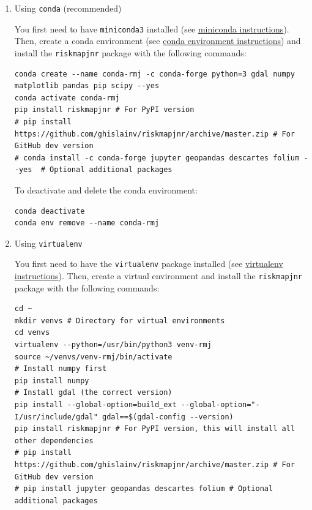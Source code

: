 \documentclass[paper=a4, 12pt, DIV=12]{scrartcl}
\begin{document}
\begin{enumerate}
\item Using \texttt{conda} (recommended)
\label{sec:org9a4f3b1}

You first need to have \texttt{miniconda3} installed (see \href{https://docs.conda.io/en/latest/miniconda.html}{miniconda instructions}). Then, create a conda environment (see \href{https://docs.conda.io/projects/conda/en/latest/user-guide/tasks/manage-environments.html}{conda environment instructions}) and install the \texttt{riskmapjnr} package with the following commands:

\begin{verbatim}
conda create --name conda-rmj -c conda-forge python=3 gdal numpy matplotlib pandas pip scipy --yes
conda activate conda-rmj
pip install riskmapjnr # For PyPI version
# pip install https://github.com/ghislainv/riskmapjnr/archive/master.zip # For GitHub dev version
# conda install -c conda-forge jupyter geopandas descartes folium --yes  # Optional additional packages
\end{verbatim}

To deactivate and delete the conda environment:

\begin{verbatim}
conda deactivate
conda env remove --name conda-rmj
\end{verbatim}

\item Using \texttt{virtualenv}
\label{sec:orgc9bc797}

You first need to have the \texttt{virtualenv} package installed (see \href{https://packaging.python.org/guides/installing-using-pip-and-virtual-environments/}{virtualenv instructions}). Then, create a virtual environment and install the \texttt{riskmapjnr} package with the following commands:

\begin{verbatim}
cd ~
mkdir venvs # Directory for virtual environments
cd venvs
virtualenv --python=/usr/bin/python3 venv-rmj
source ~/venvs/venv-rmj/bin/activate
# Install numpy first
pip install numpy
# Install gdal (the correct version) 
pip install --global-option=build_ext --global-option="-I/usr/include/gdal" gdal==$(gdal-config --version)
pip install riskmapjnr # For PyPI version, this will install all other dependencies
# pip install https://github.com/ghislainv/riskmapjnr/archive/master.zip # For GitHub dev version
# pip install jupyter geopandas descartes folium # Optional additional packages
\end{verbatim}


\end{enumerate}
\end{document}
